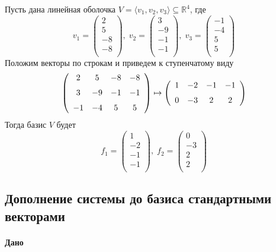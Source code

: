 \documentclass{article}
\begin{document}
Пусть дана линейная оболочка $V = \langle v_1, v_2, v_3\rangle \subseteq \mathbb R^4$, где
\[
v_{{1}} = \begin{pmatrix}
{2}\\
{5}\\
{-8}\\
{-8}\\
\end{pmatrix},\;v_{{2}} = \begin{pmatrix}
{3}\\
{-9}\\
{-1}\\
{-1}\\
\end{pmatrix},\;v_{{3}} = \begin{pmatrix}
{-1}\\
{-4}\\
{5}\\
{5}\\
\end{pmatrix}
\]
Положим векторы по строкам и приведем к ступенчатому виду
\[
\left(
\begin {array}{cccc}
2&5&-8&-8\\
\noalign{\medskip}3&-9&-1&-1\\
\noalign{\medskip}-1&-4&5&5
\end {array}
\right)
\mapsto
\left(
\begin{array}{cccc}
1&-2&-1&-1\\
\noalign{\medskip}0&-3&2&2
\end {array}
\right)
\]
Тогда базис $V$ будет
\[
f_{{1}} = \begin{pmatrix}
{1}\\
{-2}\\
{-1}\\
{-1}\\
\end{pmatrix},\;f_{{2}} = \begin{pmatrix}
{0}\\
{-3}\\
{2}\\
{2}\\
\end{pmatrix}
\]

\subsection{Дополнение системы до базиса стандартными векторами}

\paragraph{Дано}
\end{document}
